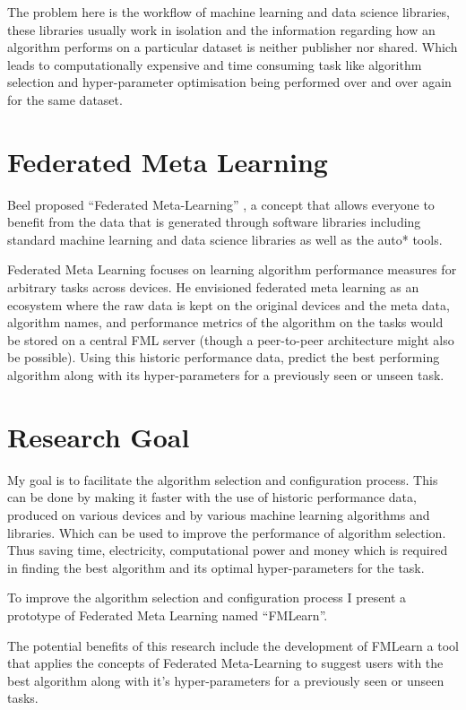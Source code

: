 The problem here is the workflow of machine learning and data science libraries, these libraries usually work in isolation and the information regarding how an algorithm performs on a particular dataset is neither publisher nor shared. Which leads to computationally expensive and time consuming task like algorithm selection and hyper-parameter optimisation being performed over and over again for the same dataset.

\section{Federated Meta Learning}
Beel proposed “Federated Meta-Learning” \citep{fml}, a concept that allows everyone to benefit from the data that is generated through software libraries including standard machine learning and data science libraries as well as the auto* tools. 

Federated Meta Learning focuses on learning algorithm performance measures for arbitrary tasks across devices. He envisioned federated meta learning as an ecosystem where the raw data is kept on the original  devices and the meta data, algorithm names, and performance metrics of the algorithm on the tasks would be stored on a central FML server (though a peer-to-peer architecture might also be possible). Using this historic performance data, predict the best performing algorithm along with its hyper-parameters for a previously seen or unseen task.


\section{Research Goal}
My goal is to facilitate the algorithm selection and configuration process. This can be done by making it faster with the use of historic performance data, produced on various devices and by various machine learning algorithms and libraries. Which can be used to improve the performance of algorithm selection. Thus saving time, electricity, computational power and money which is required in finding the best algorithm and its optimal hyper-parameters for the task.

To improve the algorithm selection and configuration process I present a prototype of Federated Meta Learning named “FMLearn”.

The potential benefits of this research include the development of FMLearn a tool that applies the concepts of Federated Meta-Learning to suggest users with the best algorithm along with it's hyper-parameters for a previously seen or unseen tasks.

